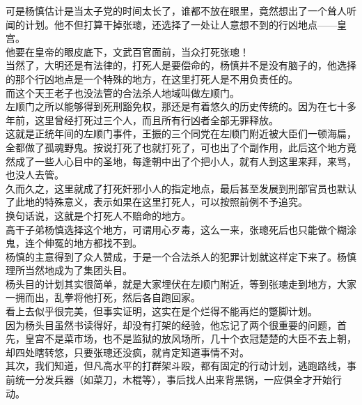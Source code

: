 \begin{multicols}{\theparacolNo}
可是杨慎估计是当太子党的时间太长了，谁都不放在眼里，竟然想出了一个耸人听闻的计划。他不但打算干掉张璁，还选择了一处让人意想不到的行凶地点——皇宫。\\

他要在皇帝的眼皮底下，文武百官面前，当众打死张璁！\\

当然了，大明还是有法律的，打死人是要偿命的，杨慎并不是没有脑子的，他选择的那个行凶地点是一个特殊的地方，在这里打死人是不用负责任的。\\

而这个天王老子也没法管的合法杀人地域叫做左顺门。\\

左顺门之所以能够得到死刑豁免权，那还是有着悠久的历史传统的。因为在七十多年前，这里曾经打死过三个人，而且所有行凶者全部无罪释放。\\

这就是正统年间的左顺门事件，王振的三个同党在左顺门附近被大臣们一顿海扁，全都做了孤魂野鬼。按说打死了也就打死了，可也出了个副作用，此后这个地方竟然成了一些人心目中的圣地，每逢朝中出了个把小人，就有人到这里来拜，来骂，也没人去管。\\

久而久之，这里就成了打死奸邪小人的指定地点，最后甚至发展到刑部官员也默认了此地的特殊意义，表示如果在这里打死人，可以按照前例不予追究。\\

换句话说，这就是个打死人不赔命的地方。\\

高干子弟杨慎选择这个地方，可谓用心歹毒，这么一来，张璁死后也只能做个糊涂鬼，连个伸冤的地方都找不到。\\

杨慎的主意得到了众人赞成，于是一个合法杀人的犯罪计划就这样定下来了。杨慎理所当然地成为了集团头目。\\

杨头目的计划其实很简单，就是大家埋伏在左顺门附近，等到张璁走到地方，大家一拥而出，乱拳将他打死，然后各自跑回家。\\

看上去似乎很完美，但事实证明，这实在是个烂得不能再烂的蹩脚计划。\\

因为杨头目虽然书读得好，却没有打架的经验，他忘记了两个很重要的问题，首先，皇宫不是菜市场，也不是监狱的放风场所，几十个衣冠楚楚的大臣不去上朝，却四处瞎转悠，只要张璁还没疯，就肯定知道事情不对。\\

其次，我们知道，但凡高水平的打群架斗殴，都有固定的行动计划，逃跑路线，事前统一分发兵器（如菜刀，木棍等），事后找人出来背黑锅，一应俱全才开始行动。\\


\end{multicols}
